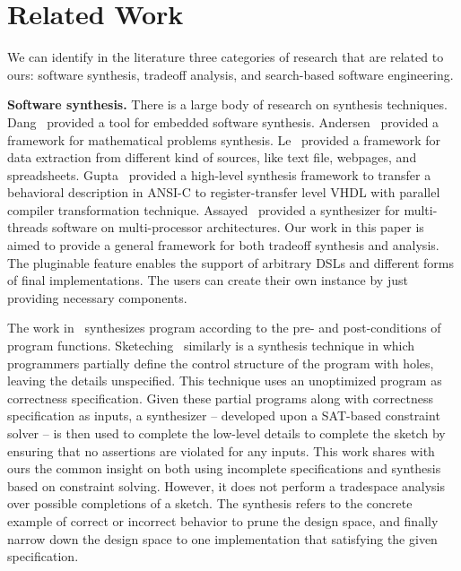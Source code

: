 \documentclass[10pt,conference]{IEEEtran}
\begin{document}
\section{Related Work}
\label{relatedwork}
We can identify in the literature three categories of research that are related to ours: 
software synthesis, tradeoff analysis, and search-based software engineering. 

\textbf{Software synthesis.} There is a large body of research on synthesis techniques. Dang~\cite{tool_for_embedded_system} provided a tool for embedded software synthesis. Andersen~\cite{tool_for_education_progressions} provided a framework for mathematical problems synthesis. Le~\cite{tool_for_data_extraction} provided a framework for data extraction from different kind of sources, like text file, webpages, and spreadsheets. Gupta~\cite{tool_for_parallel_compiler_transformations} provided a high-level synthesis framework to transfer a behavioral description in ANSI-C to register-transfer level VHDL with parallel compiler transformation technique. Assayed~\cite{tool_for_sw_synthesis} provided a synthesizer for multi-threads software on multi-processor architectures. Our work in this paper is aimed to provide a general framework for both tradeoff synthesis and analysis. The pluginable feature enables the support of arbitrary DSLs and different forms of final implementations. The users can create their own instance by just providing necessary components.

The work in~\cite{verify_to_synthesis} synthesizes program according to the pre- and post-conditions of program functions. %
Sketeching~\cite{program_sketching} similarly is a synthesis technique in which programmers partially define the control structure of the program with holes, leaving the details unspecified. This technique uses an unoptimized program as correctness specification. Given these partial programs along with correctness specification as inputs, a synthesizer -- developed upon a SAT-based constraint solver -- is then used to complete the low-level details to complete the sketch by ensuring that no assertions are violated for any inputs. This work shares with ours the common insight on both using incomplete specifications and synthesis based on constraint solving. However, it does not perform a tradespace analysis over possible completions of a sketch. The synthesis refers to the concrete example of correct or incorrect behavior to prune the design space, and finally narrow down the design space to one implementation that satisfying the given specification.
\end{document}
